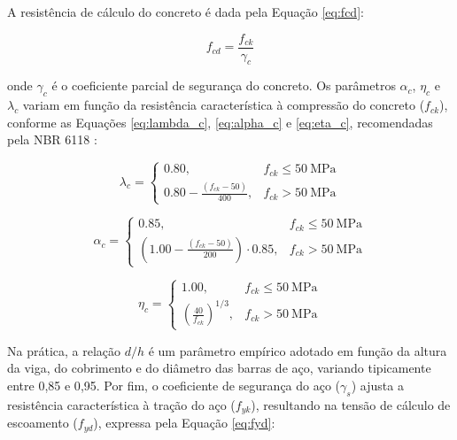 A resistência de cálculo do concreto é dada pela Equação \eqref{eq:fcd}:

\begin{equation}\label{eq:fcd}
f_{cd} = \frac{f_{ck}}{\gamma_c}
\end{equation}

onde $\gamma_c$ é o coeficiente parcial de segurança do concreto. Os parâmetros $\alpha_c$, $\eta_c$ e $\lambda_c$ variam em função da resistência característica à compressão do concreto ($f_{ck}$), conforme as Equações \eqref{eq:lambda_c}, \eqref{eq:alpha_c} e \eqref{eq:eta_c}, recomendadas pela NBR 6118 \cite{associacao_brasileira_de_normas_tecnicas_nbr_2023}:

\begin{equation}\label{eq:lambda_c}
\lambda_c =
\begin{cases}
0.80, & f_{ck} \leq 50~\text{MPa} \\
0.80 - \displaystyle\frac{(f_{ck} - 50)}{400}, & f_{ck} > 50~\text{MPa}
\end{cases}
\end{equation}

\vspace{6pt}

\begin{equation}\label{eq:alpha_c}
\alpha_c =
\begin{cases}
0.85, & f_{ck} \leq 50~\text{MPa} \\
(1.00 - \displaystyle\frac{(f_{ck} - 50)}{200}) \cdot 0.85, & f_{ck} > 50~\text{MPa}
\end{cases}
\end{equation}

\vspace{6pt}

\begin{equation}\label{eq:eta_c}
\eta_c =
\begin{cases}
1.00, & f_{ck} \leq 50~\text{MPa} \\
\left( \displaystyle\frac{40}{f_{ck}} \right)^{1/3}, & f_{ck} > 50~\text{MPa}
\end{cases}
\end{equation}

\vspace{6pt}

Na prática, a relação $d/h$ é um parâmetro empírico adotado em função da altura da viga, do cobrimento e do diâmetro das barras de aço, variando tipicamente entre 0{,}85 e 0{,}95. Por fim, o coeficiente de segurança do aço ($\gamma_s$) ajusta a resistência característica à tração do aço ($f_{yk}$), resultando na tensão de cálculo de escoamento ($f_{yd}$), expressa pela Equação \eqref{eq:fyd}:

